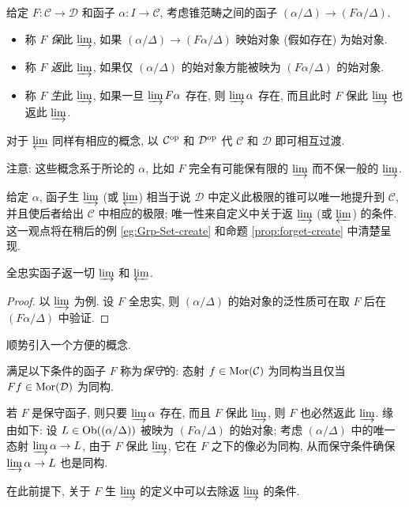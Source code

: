 \begin{definition}\label{def:create-limit}
	给定 $F: \mathcal{C} \to \mathcal{D}$ 和函子 $\alpha: I \to \mathcal{C}$, 考虑锥范畴之间的函子 $(\alpha/\Delta) \to (F\alpha/\Delta)$.
	\begin{itemize}
		\item 称 $F$ \emph{保}此 $\varinjlim$, 如果 $(\alpha/\Delta) \to (F\alpha/\Delta)$ 映始对象 (假如存在) 为始对象.
		\item 称 $F$ \emph{返}此 $\varinjlim$, 如果仅 $(\alpha/\Delta)$ 的始对象方能被映为 $(F\alpha/\Delta)$ 的始对象.
		\item 称 $F$ \emph{生}此 $\varinjlim$, 如果一旦 $\varinjlim F\alpha$ 存在, 则 $\varinjlim \alpha$ 存在, 而且此时 $F$ 保此 $\varinjlim$ 也返此 $\varinjlim$.
	\end{itemize}
	对于 $\varprojlim$ 同样有相应的概念, 以 $\mathcal{C}^{\operatorname{op}}$ 和 $\mathcal{D}^{\operatorname{op}}$ 代 $\mathcal{C}$ 和 $\mathcal{D}$ 即可相互过渡.
\end{definition}

注意: 这些概念系于所论的 $\alpha$, 比如 $F$ 完全有可能保有限的 $\varinjlim$ 而不保一般的 $\varinjlim$.

给定 $\alpha$, 函子生 $\varinjlim$ (或 $\varprojlim$) 相当于说 $\mathcal{D}$ 中定义此极限的锥可以唯一地提升到 $\mathcal{C}$, 并且使后者给出 $\mathcal{C}$ 中相应的极限; 唯一性来自定义中关于返 $\varinjlim$ (或 $\varprojlim$) 的条件. 这一观点将在稍后的例 \ref{eg:Grp-Set-create} 和命题 \ref{prop:forget-create} 中清楚呈现. 

\begin{proposition}\label{prop:ff-reflect}
	全忠实函子返一切 $\varinjlim$ 和 $\varprojlim$.
\end{proposition}
\begin{proof}
	以 $\varinjlim$ 为例. 设 $F$ 全忠实, 则 $(\alpha/\Delta)$ 的始对象的泛性质可在取 $F$ 后在 $(F\alpha/\Delta)$ 中验证.
\end{proof}

顺势引入一个方便的概念.
\begin{definition}\label{def:conservative}
	满足以下条件的函子 $F$ 称为\emph{保守}的: 态射 $f \in \operatorname{Mor}(\mathcal{C})$ 为同构当且仅当 $Ff \in \operatorname{Mor}(\mathcal{D})$ 为同构. 
\end{definition}

\begin{remark}\label{rem:conservative-reflect}
	若 $F$ 是保守函子, 则只要 $\varinjlim \alpha$ 存在, 而且 $F$ 保此 $\varinjlim$, 则 $F$ 也必然返此 $\varinjlim$. 缘由如下: 设 $L \in \operatorname{Ob}((\alpha/\Delta))$ 被映为 $(F\alpha/\Delta)$ 的始对象; 考虑 $(\alpha/\Delta)$ 中的唯一态射 $\varinjlim \alpha \to L$, 由于 $F$ 保此 $\varinjlim$, 它在 $F$ 之下的像必为同构, 从而保守条件确保 $\varinjlim \alpha \to L$ 也是同构.
	
	在此前提下, 关于 $F$ 生 $\varinjlim$ 的定义中可以去除返 $\varinjlim$ 的条件.
\end{remark}

